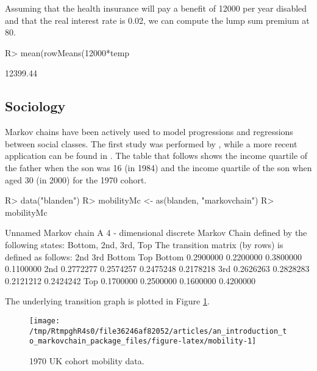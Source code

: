\documentclass[
  nojss]{jss}
\begin{document}
Assuming that the health insurance will pay a benefit of 12000 per year disabled and that the real interest rate is 0.02, we can compute the lump sum premium at 80.

\begin{CodeChunk}

\begin{CodeInput}
R> mean(rowMeans(12000*temp%
\end{CodeInput}

\begin{CodeOutput}
[1] 12399.44
\end{CodeOutput}
\end{CodeChunk}

\hypertarget{app:sociology}{%
\subsection{Sociology}\label{app:sociology}}

Markov chains have been actively used to model progressions and regressions between social classes. The first study was performed by \cite{glassHall}, while a more recent application can be found in \cite{blandenEtAlii}. The table that follows shows the income quartile of the father when the son was 16 (in 1984) and the income quartile of the son when aged 30 (in 2000) for the 1970 cohort.

\begin{CodeChunk}

\begin{CodeInput}
R> data("blanden")
R> mobilityMc <- as(blanden, "markovchain")
R> mobilityMc
\end{CodeInput}

\begin{CodeOutput}
Unnamed Markov chain 
 A  4 - dimensional discrete Markov Chain defined by the following states: 
 Bottom, 2nd, 3rd, Top 
 The transition matrix  (by rows)  is defined as follows: 
             2nd       3rd    Bottom       Top
Bottom 0.2900000 0.2200000 0.3800000 0.1100000
2nd    0.2772277 0.2574257 0.2475248 0.2178218
3rd    0.2626263 0.2828283 0.2121212 0.2424242
Top    0.1700000 0.2500000 0.1600000 0.4200000
\end{CodeOutput}
\end{CodeChunk}

The underlying transition graph is plotted in Figure \ref{fig:mobility}.

\begin{CodeChunk}
\begin{figure}

{\centering \texttt{[image: /tmp/RtmpghR4s0/file36246af82052/articles/an\_introduction\_to\_markovchain\_package\_files/figure-latex/mobility-1]} 

}

\caption[1970 UK cohort mobility data]{1970 UK cohort mobility data.}\label{fig:mobility}
\end{figure}
\end{CodeChunk}
\end{document}
